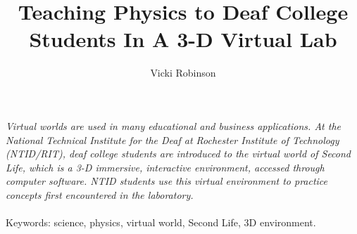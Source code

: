 \documentclass[11.5pt]{sig-alternate} %
\makeatletter
\let\oldabstract\abstract
\let\oldendabstract\endabstract
\renewenvironment{abstract} %
{\renewenvironment{quotation}%
               {\list{}{\addtolength{\leftmargin}{1em} %
                        \listparindent 1.5em%
                        \itemindent    \listparindent%
                        \rightmargin   \leftmargin%
                        \parsep        \z@ \@plus\p@}%
                \item\relax}%
               {\endlist}%
\oldabstract}
{\oldendabstract}
\makeatother
\begin{document}
\title{Teaching Physics to Deaf College Students In A 3-D Virtual Lab}

\author[1]{\large \color{blue}Vicki Robinson}


\toappear{}
\maketitle
\begin{@twocolumnfalse} 
\begin{abstract}
\item 
\textit{Virtual worlds are used in many educational and business applications. At the National Technical Institute for the Deaf at Rochester Institute of Technology (NTID/RIT), deaf college students are introduced to the virtual world of Second Life, which is a 3-D immersive, interactive environment, accessed through computer software. NTID students use this virtual environment to practice concepts first encountered in the laboratory.}
\\ \\
Keywords: science, physics, virtual world, Second Life, 3D environment.
\end{abstract}
\end{@twocolumnfalse}

\end{document}
